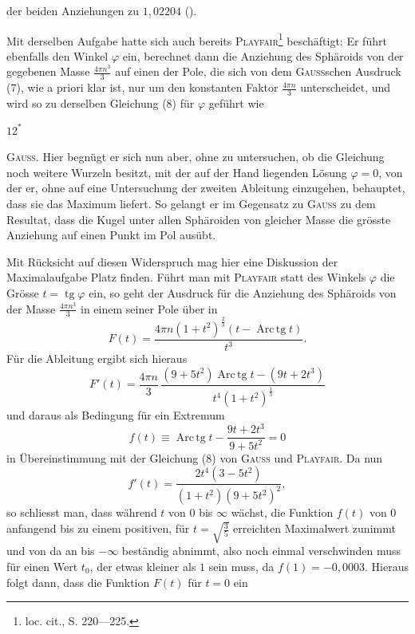 der beiden Anziehungen zu $1{,}02204$ ().
\par\noindent\hspace*{\parindent}Mit derselben Aufgabe hatte sich auch bereits \textsc{Playfair}\footnote{loc. cit., S. 220—225.} beschäftigt: Er
führt ebenfalls den Winkel $\varphi$ ein, berechnet dann die Anziehung des Sphäroids von der gegebenen Masse $\frac{4\pi n^3}3$ auf einen der Pole, die sich von dem
\textsc{Gauss}schen Ausdruck (7), wie a priori klar ist, nur um den konstanten Faktor
$\frac{4\pi n}3$ unterscheidet, und wird so zu derselben Gleichung (8) für $\varphi$ geführt wie
\par\noindent\hfill{\footnotesize $12^{*}$}\par
\clearpage{}
\noindent \textsc{Gauss}. Hier begnügt er sich nun aber, ohne zu untersuchen, ob die Gleichung noch weitere Wurzeln besitzt, mit der auf der Hand liegenden Lösung
$\varphi=0$, von der er, ohne auf eine Untersuchung der zweiten Ableitung einzugehen, behauptet, dass sie das Maximum liefert. So gelangt er im Gegensatz zu \textsc{Gauss} zu dem Resultat, dass die Kugel unter allen Sphäroiden von
gleicher Masse die grösste Anziehung auf einen Punkt im Pol ausübt.
\par\noindent\hspace*{\parindent}Mit Rücksicht auf diesen Widerspruch mag hier eine Diskussion der
Maximalaufgabe Platz finden. Führt man mit \textsc{Playfair} statt des Winkels $\varphi$
die Grösse $t=\operatorname{tg}\varphi$ ein, so geht der Ausdruck für die Anziehung des Sphäroids von der Masse $\frac{4\pi n^3}3$ in einem seiner Pole über in
\[
F(t)=\frac{4\pi n(1+t^2)^{\frac23}(t-\operatorname{Arc\,tg}t)}{t^3}.
\]
Für die Ableitung ergibt sich hieraus
\[
F'(t)=\frac{4\pi n}3\,\frac{(9+5t^2)\operatorname{Arc\,tg}t-(9t+2t^3)}{t^4(1+t^2)^{\frac13}}
\]
und daraus als Bedingung für ein Extremum
\[
f(t)\equiv\operatorname{Arc\,tg}t-\frac{9t+2t^3}{9+5t^2}=0
\]
in Übereinstimmung mit der Gleichung (8) von \textsc{Gauss} und \textsc{Playfair}. Da nun
\[
f'(t)=\frac{2t^4(3-5t^2)}{(1+t^2)(9+5t^2)^2},
\]
so schliesst man, dass während $t$ von $0$ bis $\infty$ wächst, die Funktion $f(t)$ von
$0$ anfangend bis zu einem positiven, für $t=\sqrt{\frac35}$ erreichten Maximalwert zunimmt und von da an bis $-\infty$ beständig abnimmt, also noch einmal verschwinden muss für einen Wert $t_0$, der etwas kleiner als $1$ sein muss, da
$f(1)=-0{,}0003$. Hieraus folgt dann, dass die Funktion $F(t)$ für $t=0$ ein
